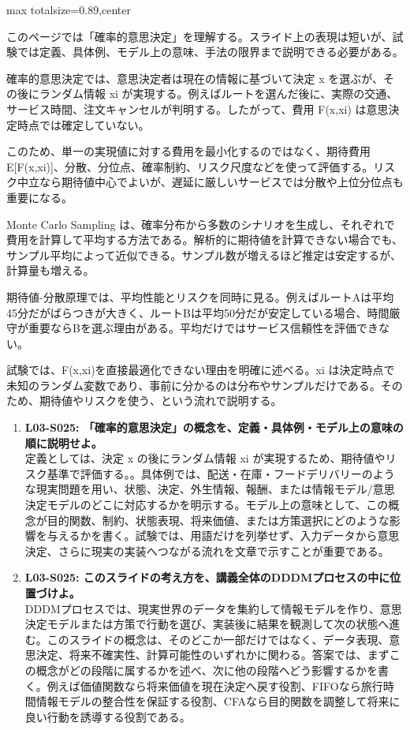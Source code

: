 \begin{minipage}[t]{0.58\textwidth}
\begin{adjustbox}{max totalsize={\textwidth}{0.89\textheight},center}
\begin{minipage}{\textwidth}\scriptsize
{}このページでは「確率的意思決定」を理解する。スライド上の表現は短いが、試験では定義、具体例、モデル上の意味、手法の限界まで説明できる必要がある。\par
確率的意思決定では、意思決定者は現在の情報に基づいて決定 x を選ぶが、その後にランダム情報 xi が実現する。例えばルートを選んだ後に、実際の交通、サービス時間、注文キャンセルが判明する。したがって、費用 F(x,xi) は意思決定時点では確定していない。\par
このため、単一の実現値に対する費用を最小化するのではなく、期待費用 E[F(x,xi)]、分散、分位点、確率制約、リスク尺度などを使って評価する。リスク中立なら期待値中心でよいが、遅延に厳しいサービスでは分散や上位分位点も重要になる。\par
Monte Carlo Sampling は、確率分布から多数のシナリオを生成し、それぞれで費用を計算して平均する方法である。解析的に期待値を計算できない場合でも、サンプル平均によって近似できる。サンプル数が増えるほど推定は安定するが、計算量も増える。\par
期待値-分散原理では、平均性能とリスクを同時に見る。例えばルートAは平均45分だがばらつきが大きく、ルートBは平均50分だが安定している場合、時間厳守が重要ならBを選ぶ理由がある。平均だけではサービス信頼性を評価できない。\par
試験では、F(x,xi)を直接最適化できない理由を明確に述べる。xi は決定時点で未知のランダム変数であり、事前に分かるのは分布やサンプルだけである。そのため、期待値やリスクを使う、という流れで説明する。\par{}\begin{enumerate}\item \textbf{L03-S025: 「確率的意思決定」の概念を、定義・具体例・モデル上の意味の順に説明せよ。}\\定義としては、決定 x の後にランダム情報 xi が実現するため、期待値やリスク基準で評価する。。具体例では、配送・在庫・フードデリバリーのような現実問題を用い、状態、決定、外生情報、報酬、または情報モデル/意思決定モデルのどこに対応するかを明示する。モデル上の意味として、この概念が目的関数、制約、状態表現、将来価値、または方策選択にどのような影響を与えるかを書く。試験では、用語だけを列挙せず、入力データから意思決定、さらに現実の実装へつながる流れを文章で示すことが重要である。\item \textbf{L03-S025: このスライドの考え方を、講義全体のDDDMプロセスの中に位置づけよ。}\\DDDMプロセスでは、現実世界のデータを集約して情報モデルを作り、意思決定モデルまたは方策で行動を選び、実装後に結果を観測して次の状態へ進む。このスライドの概念は、そのどこか一部だけではなく、データ表現、意思決定、将来不確実性、計算可能性のいずれかに関わる。答案では、まずこの概念がどの段階に属するかを述べ、次に他の段階へどう影響するかを書く。例えば価値関数なら将来価値を現在決定へ戻す役割、FIFOなら旅行時間情報モデルの整合性を保証する役割、CFAなら目的関数を調整して将来に良い行動を誘導する役割である。\end{enumerate}

\end{minipage}
\end{adjustbox}
\end{minipage}
